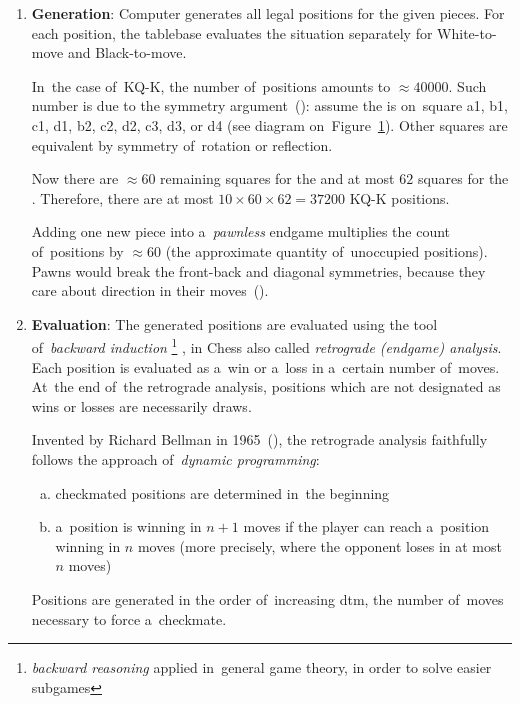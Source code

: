 \begin{enumerate}[1]
  \item \textbf{Generation}:
    Computer generates all legal positions for the given pieces.
    For each position, the tablebase evaluates the situation separately for White-to-move and Black-to-move.

    In~the case of~KQ-K, the number of~positions amounts to $\approx 40000$.
    Such number is due to the symmetry argument~(\cite{Levy2009computers}):
    assume the \kingB{} is on~square a1, b1, c1, d1, b2, c2, d2, c3, d3, or d4 (see diagram on~Figure~\ref{fig:non-symmetric-black-king}).
    Other squares are equivalent by symmetry of~rotation or reflection.

    Now there are $\approx 60$ remaining squares for the \king{} and at most $62$ squares for the \queen.
    Therefore, there are at most $10 \times 60 \times 62 = 37200$ KQ-K positions.
    \begin{figure}[H]
      \centering
      \newgame
      \showboard
      \label{fig:non-symmetric-black-king}
    \end{figure}

    Adding one new piece into a~\emph{pawnless} endgame multiplies the count of~positions by $\approx 60$ (the approximate quantity of~unoccupied positions).
    Pawns would break the front-back and diagonal symmetries, because they care about direction in their moves~(\cite{Muller2006EGTB}).

  \item \textbf{Evaluation}:
    The generated positions are evaluated using the tool of~\emph{backward induction}%
    \footnote{\emph{backward reasoning} applied in~general game theory, in order to solve easier subgames}
    , in Chess also called \emph{retrograde (endgame) analysis}.
    Each position is evaluated as a~win or a~loss in a~certain number of~moves.
    At~the end of~the retrograde analysis, positions which are not designated as wins or losses are necessarily draws.

    Invented by Richard Bellman in 1965~(\cite{Bellman1965application}), the retrograde analysis faithfully follows the approach of~\emph{dynamic programming}:
    \begin{enumerate}[(a)]
      \item checkmated positions are determined in~the beginning
      \item a~position is winning in $n+1$ moves if the player can reach a~position winning in $n$ moves (more precisely, where the opponent loses in at most $n$ moves)
    \end{enumerate}
    Positions are generated in the order of~increasing \acrfull{dtm}, the number of~moves necessary to force a~checkmate.


\end{enumerate}
